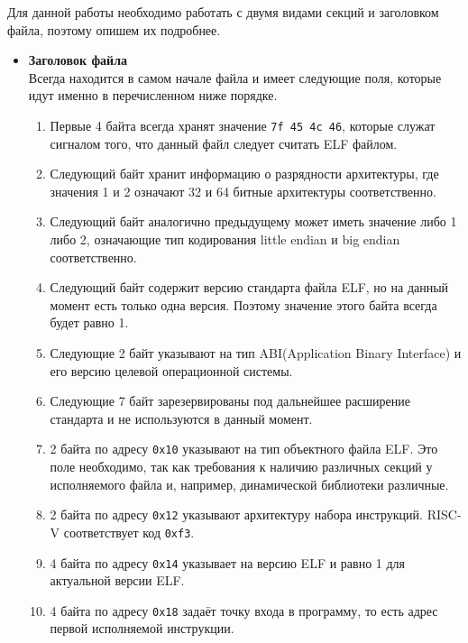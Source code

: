 \documentclass[14pt, russian, onesize]{extreport}
\begin{document}
Для данной работы необходимо работать с двумя видами секций и заголовком файла,
поэтому опишем их подробнее.
\begin{itemize}
    \item \textbf{Заголовок файла}\\
        Всегда находится в самом начале файла и имеет следующие поля, которые
        идут именно в перечисленном ниже порядке.
        \begin{enumerate}
            \item Первые 4 байта всегда хранят значение \texttt{7f 45 4c 46},
                которые служат сигналом того, что данный файл следует
                считать ELF файлом.
            \item Следующий байт хранит информацию о разрядности архитектуры,
                где значения 1 и 2 означают 32 и 64 битные архитектуры
                соответственно.
            \item Следующий байт аналогично предыдущему может иметь значение
                либо 1 либо 2, означающие тип кодирования little endian
                и big endian соответственно.
            \item Следующий байт содержит версию стандарта файла ELF,
                но на данный момент есть только одна версия.
                Поэтому значение этого байта всегда будет равно 1.
            \item Следующие 2 байт указывают на тип ABI(Application Binary Interface)
                и его версию целевой операционной системы.
            \item Следующие 7 байт зарезервированы под дальнейшее расширение
                стандарта и не используются в данный момент.
            \item 2 байта по адресу \texttt{0x10} указывают на тип объектного
                файла ELF. Это поле необходимо, так как требования
                к наличию различных секций у исполняемого файла и, например, 
                динамической библиотеки различные.
            \item 2 байта по адресу \texttt{0x12} указывают архитектуру
                набора инструкций. RISC-V соответствует код \texttt{0xf3}.
            \item 4 байта по адресу \texttt{0x14} указывает на версию ELF и равно
                1 для актуальной версии ELF.
            \item 4 байта по адресу \texttt{0x18} задаёт точку входа
                в программу, то есть адрес первой исполняемой инструкции.

\end{enumerate}
\end{itemize}
\end{document}
